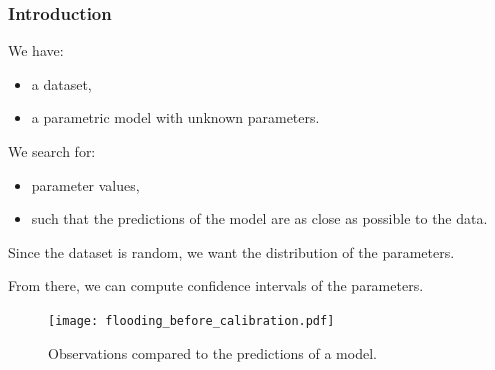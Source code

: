 \documentclass[9pt]{beamer}
\begin{document}
\begin{frame}
\frametitle{Introduction}

We have:
\begin{itemize}
\item a dataset,
\item a parametric model with unknown parameters.
\end{itemize}

We search for:
\begin{itemize}
\item parameter values,
\item such that the predictions of the model are as close as possible to the data.
\end{itemize}

Since the dataset is random, we want the distribution of the parameters.

From there, we can compute confidence intervals of the parameters.

\begin{figure}
\begin{center}
\texttt{[image: flooding\_before\_calibration.pdf]}
\end{center}
\caption{Observations compared to the predictions of a model.}
\end{figure}

\end{frame}

\end{document}
